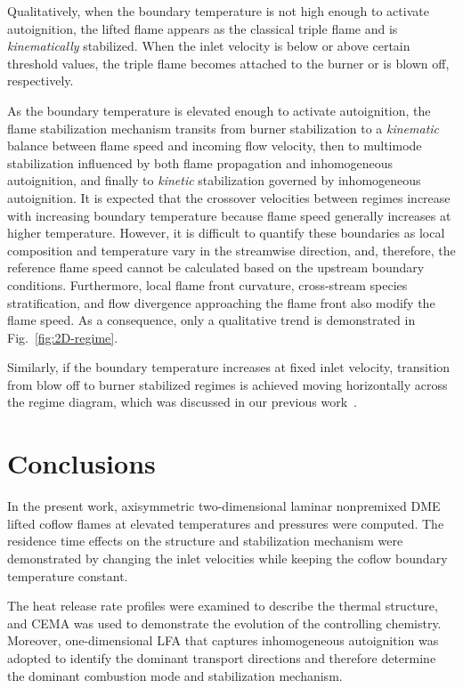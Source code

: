 \documentclass[review,3p,times]{elsarticle}
\begin{document}
Qualitatively, when the boundary temperature is not high enough to activate autoignition, the lifted flame appears as the classical triple flame and is \emph{kinematically} stabilized.  When the inlet velocity is below or above certain threshold values, the triple flame becomes attached to the burner or is blown off, respectively.  

As the boundary temperature is elevated enough to activate autoignition, the flame stabilization mechanism transits from burner stabilization to a \emph{kinematic} balance between flame speed and incoming flow velocity, then to multimode stabilization influenced by both flame propagation and inhomogeneous autoignition, and finally to \emph {kinetic} stabilization governed by inhomogeneous autoignition.  It is expected that the crossover velocities between regimes increase with increasing boundary temperature because flame speed generally increases at higher temperature.  However, it is difficult to quantify these boundaries as local composition and temperature vary in the streamwise direction, and, therefore, the reference flame speed cannot be calculated based on the upstream boundary conditions.  Furthermore, local flame front curvature, cross-stream species stratification, and flow divergence approaching the flame front also modify the flame speed.  As a consequence, only a qualitative trend is demonstrated in Fig.~\ref{fig:2D-regime}.  

Similarly, if the boundary temperature increases at fixed inlet velocity, transition from blow off to burner stabilized regimes is achieved moving horizontally across the regime diagram, which was discussed in our previous work~\cite{deng15}.     



\section{Conclusions}

In the present work, axisymmetric two-dimensional laminar nonpremixed DME lifted coflow flames at elevated temperatures and pressures were computed.  The residence time effects on the structure and stabilization mechanism were demonstrated by changing the inlet velocities while keeping the coflow boundary temperature constant.

The heat release rate profiles were examined to describe the thermal structure, and CEMA was used to demonstrate the evolution of the controlling chemistry.  Moreover, one-dimensional LFA that captures inhomogeneous autoignition was adopted to identify the dominant transport directions and therefore determine the dominant combustion mode and stabilization mechanism.
\end{document}
